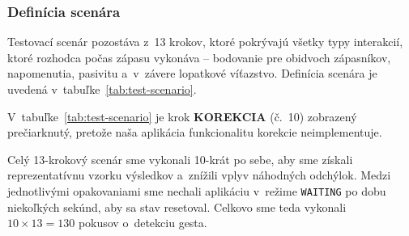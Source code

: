 \subsubsection{Definícia scenára}

Testovací scenár pozostáva z~13 krokov, ktoré
pokrývajú všetky typy interakcií, ktoré rozhodca
počas zápasu vykonáva -- bodovanie pre obidvoch
zápasníkov, napomenutia, pasivitu a~v~závere
lopatkové víťazstvo. Definícia scenára
je uvedená v~tabuľke~\ref{tab:test-scenario}.

V~tabuľke~\ref{tab:test-scenario} je krok \textbf{KOREKCIA}
(č.~10) zobrazený prečiarknutý, pretože naša aplikácia
funkcionalitu korekcie neimplementuje.

Celý 13-krokový scenár sme vykonali 10-krát po sebe,
aby sme získali reprezentatívnu vzorku výsledkov a~znížili
vplyv náhodných odchýlok. Medzi jednotlivými opakovaniami
sme nechali aplikáciu v~režime \texttt{WAITING} po dobu
niekoľkých sekúnd, aby sa stav resetoval. Celkovo sme
teda vykonali $10 \times 13 = 130$ pokusov o~detekciu gesta.

